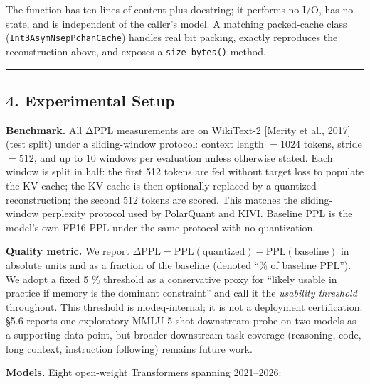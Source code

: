 \documentclass[
]{article}
\begin{document}
The function has ten lines of content plus docstring; it performs no
I/O, has no state, and is independent of the caller's model. A matching
packed-cache class (\texttt{Int3AsymNsepPchanCache}) handles real bit
packing, exactly reproduces the reconstruction above, and exposes a
\texttt{size\_bytes()} method.

\begin{center}\rule{0.5\linewidth}{0.5pt}\end{center}

\subsection{4. Experimental Setup}\label{experimental-setup}

\textbf{Benchmark.} All ΔPPL measurements are on WikiText-2 {[}Merity et
al., 2017{]} (test split) under a sliding-window protocol: context
length \(= 1024\) tokens, stride \(= 512\), and up to 10 windows per
evaluation unless otherwise stated. Each window is split in half: the
first 512 tokens are fed without target loss to populate the KV cache;
the KV cache is then optionally replaced by a quantized reconstruction;
the second 512 tokens are scored. This matches the sliding-window
perplexity protocol used by PolarQuant and KIVI. Baseline PPL is the
model's own FP16 PPL under the same protocol with no quantization.

\textbf{Quality metric.} We report
\(\Delta\mathrm{PPL} = \mathrm{PPL}(\text{quantized}) - \mathrm{PPL}(\text{baseline})\)
in absolute units and as a fraction of the baseline (denoted ``\% of
baseline PPL''). We adopt a fixed 5 \% threshold as a conservative proxy
for ``likely usable in practice if memory is the dominant constraint''
and call it the \emph{usability threshold} throughout. This threshold is
modeq-internal; it is not a deployment certification. §5.6 reports one
exploratory MMLU 5-shot downstream probe on two models as a supporting
data point, but broader downstream-task coverage (reasoning, code, long
context, instruction following) remains future work.

\textbf{Models.} Eight open-weight Transformers spanning 2021--2026:
\end{document}
